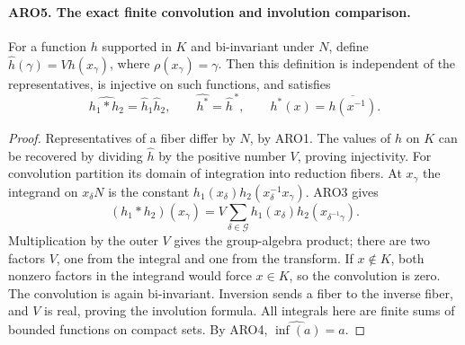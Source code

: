 \paragraph{ARO5. The exact finite convolution and involution comparison.}
\label{claim:ARO5}
For a function \(h\) supported in \(K\) and bi-invariant under
\(N\), define \(\widehat h(\gamma)=Vh(x_\gamma)\), where
\(\rho(x_\gamma)=\gamma\).  Then this definition is independent of
the representatives, is injective on such functions, and satisfies
\[
 \widehat{h_1*h_2}=\widehat h_1\widehat h_2,
 \qquad
 \widehat{h^*}=\widehat h^{\,*},
 \qquad h^*(x)=\overline{h(x^{-1})}.
 \tag{ARO.5}
\]
\begin{proof}
Representatives of a fiber differ by \(N\), by ARO1.
The values of \(h\) on \(K\) can be recovered by dividing
\(\widehat h\) by the positive number \(V\), proving injectivity.
For convolution partition its domain of integration into reduction
fibers.  At \(x_\gamma\) the integrand on \(x_\delta N\) is the
constant \(h_1(x_\delta)h_2(x_\delta^{-1}x_\gamma)\).  ARO3 gives
\[
 (h_1*h_2)(x_\gamma)
 =V\sum_{\delta\in\mathcal G}
           h_1(x_\delta)h_2(x_{\delta^{-1}\gamma}).
\]
Multiplication by the outer \(V\) gives the group-algebra product;
there are two factors \(V\), one from the integral and one from the
transform.  If \(x\notin K\), both nonzero factors in the integrand
would force \(x\in K\), so the convolution is zero.  The convolution
is again bi-invariant.  Inversion sends a fiber to the inverse
fiber, and \(V\) is real, proving the involution formula.  All
integrals here are finite sums of bounded functions on compact sets.
By ARO4, \(\widehat{\operatorname{inf}(a)}=a\).
\end{proof}

